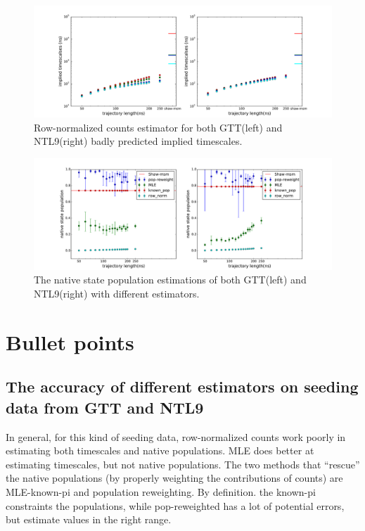 \documentclass[%
 aip,
rsi,%
 amsmath,amssymb,
 reprint,%
]{revtex4-1}
\begin{document}
\begin{figure}
\includegraphics[width=0.8\paperwidth]{figures/NTL9_GTT/row_norm_5trajs.pdf}%
\caption{Row-normalized counts estimator for both GTT(left) and NTL9(right) badly predicted implied timescales.}
\end{figure}

\begin{figure}
\includegraphics[width=0.8\paperwidth]{figures/NTL9_GTT/native_population_5trajs.pdf}%
\caption{The native state population  estimations of both GTT(left) and NTL9(right) with different estimators.}
\end{figure}


%

\section{Bullet points}

\subsection{The accuracy of different estimators on seeding data from GTT and NTL9}

In general, for this kind of seeding data, row-normalized counts work poorly in estimating both timescales and native populations.  MLE does better at estimating timescales, but not native populations.  The two methods that ``rescue'' the native populations (by properly weighting the contributions of counts) are MLE-known-pi  and population reweighting.  By definition. the known-pi constraints the populations, while pop-reweighted has a lot of potential errors, but estimate values in the right range.
\end{document}
